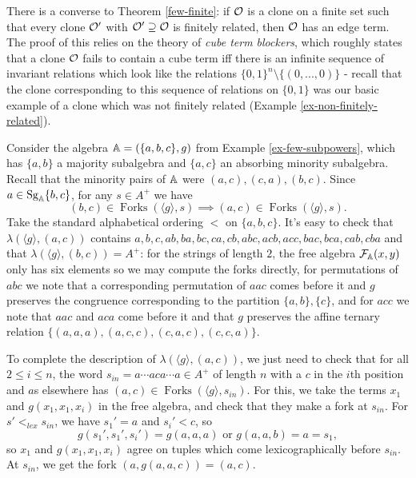 \documentclass[letterpaper,11pt]{article}
\DeclareMathOperator{\Sg}{Sg}
\DeclareMathOperator{\Forks}{Forks}
\begin{document}
\begin{rem} There is a converse to Theorem \ref{few-finite}: if $\mathcal{O}$ is a clone on a finite set such that every clone $\mathcal{O}'$ with $\mathcal{O}' \supseteq \mathcal{O}$ is finitely related, then $\mathcal{O}$ has an edge term. The proof of this relies on the theory of \emph{cube term blockers}, which roughly states that a clone $\mathcal{O}$ fails to contain a cube term iff there is an infinite sequence of invariant relations which look like the relations $\{0,1\}^n\setminus\{(0,...,0)\}$ - recall that the clone corresponding to this sequence of relations on $\{0,1\}$ was our basic example of a clone which was not finitely related (Example \ref{ex-non-finitely-related}).
\end{rem}

\begin{ex} Consider the algebra $\mathbb{A} = (\{a,b,c\},g)$ from Example \ref{ex-few-subpowers}, which has $\{a,b\}$ a majority subalgebra and $\{a,c\}$ an absorbing minority subalgebra. Recall that the minority pairs of $\mathbb{A}$ were $(a,c), (c,a), (b,c)$. Since $a \in \Sg_{\bA}\{b,c\}$, for any $s \in A^+$ we have
\[
(b,c) \in \Forks(\langle g\rangle, s) \implies (a,c) \in \Forks(\langle g\rangle, s).
\]
Take the standard alphabetical ordering $<$ on $\{a,b,c\}$. It's easy to check that $\lambda(\langle g\rangle,(a,c))$ contains $a, b, c, ab, ba, bc, ca, cb, abc, acb, acc, bac, bca, cab, cba$ and that $\lambda(\langle g \rangle, (b,c)) = A^+$: for the strings of length $2$, the free algebra $\mathcal{F}_{\mathbb{A}}(x,y)$ only has six elements so we may compute the forks directly, for permutations of $abc$ we note that a corresponding permutation of $aac$ comes before it and $g$ preserves the congruence corresponding to the partition $\{a,b\},\{c\}$, and for $acc$ we note that $aac$ and $aca$ come before it and that $g$ preserves the affine ternary relation $\{(a,a,a),(a,c,c),(c,a,c),(c,c,a)\}$.

To complete the description of $\lambda(\langle g\rangle,(a,c))$, we just need to check that for all $2 \le i \le n$, the word $s_{in} = a\cdots aca\cdots a \in A^+$ of length $n$ with a $c$ in the $i$th position and $a$s elsewhere has $(a,c) \in \Forks(\langle g\rangle, s_{in})$. For this, we take the terms $x_1$ and $g(x_1,x_1,x_i)$ in the free algebra, and check that they make a fork at $s_{in}$. For $s' <_{lex} s_{in}$, we have $s_1' = a$ and $s_i' < c$, so
\[
g(s_1',s_1',s_i') = g(a,a,a)\text{ or }g(a,a,b) = a = s_1,
\]
so $x_1$ and $g(x_1,x_1,x_i)$ agree on tuples which come lexicographically before $s_{in}$. At $s_{in}$, we get the fork $(a,g(a,a,c)) = (a,c)$.
\end{ex}
\end{document}
